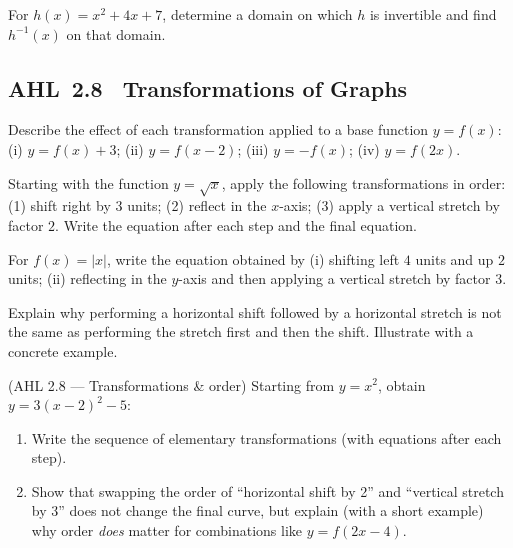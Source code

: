 \documentclass[11pt]{article}
\def\textbf#1{#1}%
\newcommand{\tocsubsection}[1]{\subsection{#1}}
\newcounter{question}
\begin{document}
\begin{question}
For $h(x)=x^2+4x+7$, determine a domain on which $h$ is invertible and find
$h^{-1}(x)$ on that domain.
\end{question}






\tocsubsection{AHL 2.8 \; Transformations of Graphs}

\begin{question}
Describe the effect of each transformation applied to a base function $y=f(x)$:
(i) $y=f(x)+3$; (ii) $y=f(x-2)$; (iii) $y=-f(x)$; (iv) $y=f(2x)$.
\end{question}

\begin{question}
Starting with the function $y=\sqrt{x}$, apply the following transformations in
order: (1) shift right by $3$ units; (2) reflect in the $x$-axis; (3) apply a
vertical stretch by factor $2$.  Write the equation after each step and the
final equation.
\end{question}

\begin{question}
For $f(x)=|x|$, write the equation obtained by (i) shifting left $4$ units and
up $2$ units; (ii) reflecting in the $y$-axis and then applying a vertical
stretch by factor $3$.
\end{question}

\begin{question}
Explain why performing a horizontal shift followed by a horizontal stretch is
not the same as performing the stretch first and then the shift.  Illustrate
with a concrete example.
\end{question}

\begin{question}
\textbf{(AHL 2.8 — Transformations \& order)} Starting from $y=x^2$, obtain $y=3(x-2)^2-5$:
\begin{enumerate}
  \item Write the sequence of elementary transformations (with equations after each step).
  \item Show that swapping the order of “horizontal shift by 2” and “vertical stretch by 3” does not change the final curve, but explain (with a short example) why order \emph{does} matter for combinations like $y=f(2x-4)$.
\end{enumerate}
\end{question}
\end{document}
